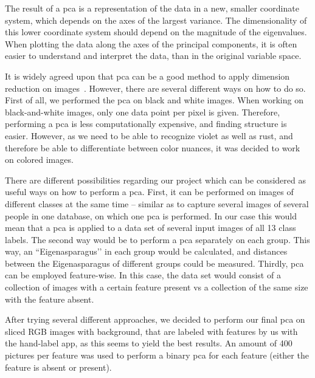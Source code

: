The result of a \acrshort{pca} is a representation of the data in a new, smaller coordinate system, which depends on the axes of the largest variance. The dimensionality of this lower coordinate system should depend on the magnitude of the eigenvalues. When plotting the data along the axes of the principal components, it is often easier to understand and interpret the data, than in the original variable space.

It is widely agreed upon that \acrshort{pca} can be a good method to apply dimension reduction on images~\citep{turk1991face,lata2009}.
However, there are several different ways on how to do so. First of all, we performed the \acrshort{pca} on black and white images. When working on black-and-white images, only one data point per pixel is given. Therefore, performing a \acrshort{pca} is less computationally expensive, and finding structure is easier. However, as we need to be able to recognize violet as well as rust, and therefore be able to differentiate between color nuances, it was decided to work on colored images.

\bigskip
There are different possibilities regarding our project which can be considered as useful ways on how to perform a \acrshort{pca}. First, it can be performed on images of different classes at the same time – similar as to capture several images of several people in one database, on which one \acrshort{pca} is performed. In our case this would mean that a \acrshort{pca} is applied to a data set of several input images of all 13 class labels. The second way would be to perform a \acrshort{pca} separately on each group. This way, an ``Eigenasparagus’’ in each group would be calculated, and distances between the Eigenasparagus of different groups could be measured. Thirdly, \acrshort{pca} can be employed feature-wise. In this case, the data set would consist of a collection of images with a certain feature present vs a collection of the same size with the feature absent.

\bigskip
After trying several different approaches, we decided to perform our final \acrshort{pca} on sliced RGB images with background, that are labeled with features by us with the hand-label app, as this seems to yield the best results. An amount of 400 pictures per feature was used to perform a binary \acrshort{pca} for each feature (either the feature is absent or present).

